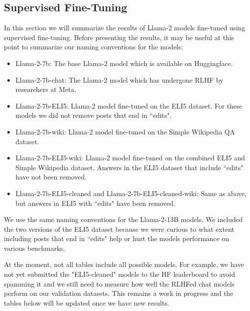 \documentclass[11pt, oneside]{article}   	%
\begin{document}
\subsection{Supervised Fine-Tuning}
In this section we will summarize the results of Llama-2 models fine-tuned using supervised fine-tuning.
Before presenting the results, it may be useful at this point to summarize our naming conventions for the models:
\begin{itemize}
\item Llama-2-7b: The base Llama-2 model which is available on Huggingface.
\item Llama-2-7b-chat: The Llama-2 model which has undergone RLHF by researchers at Meta.
\item Llama-2-7b-ELI5: Llama-2 model fine-tuned on the ELI5 dataset. For these models we did not remove posts that end in ``edits".
\item Llama-2-7b-wiki: Llama-2 model fine-tuned on the Simple Wikipedia QA dataset.
\item Llama-2-7b-ELI5-wiki: Llama-2 model fine-tuned on the combined ELI5 and Simple Wikipedia dataset. Answers in the ELI5 dataset that include ``edits" have not been removed.
\item Llama-2-7b-ELI5-cleaned and Llama-2-7b-ELI5-cleaned-wiki: Same as above, but answers in ELI5 with ``edits" have been removed. 
\end{itemize}
We use the same naming conventions for the Llama-2-13B models. 
We included the two versions of the ELI5 dataset because we were curious to what extent including posts that end in ``edits" help or hurt the models performance on various benchmarks.

At the moment, not all tables include all possible models.
For example, we have not yet submitted the "ELI5-cleaned" models to the HF leaderboard to avoid spamming it and we still need to measure how well the RLHFed chat models perform on our validation datasets.
This remains a work in progress and the tables below will be updated once we have new results.
\end{document}
